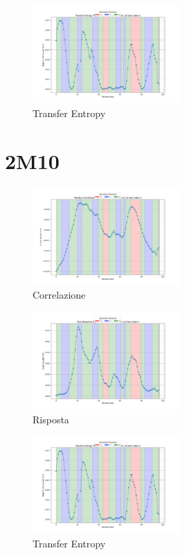 \documentclass{article}
\begin{document}
\begin{figure}[h]
    \centering
    \includegraphics[width=0.5\textwidth]{images/Transfer Entropy TE_ij for i=22 as a function of j at time index 0.png}
    \caption{Transfer Entropy}
\end{figure}




\section{2M10}
\begin{figure}[h]
    \centering
    \includegraphics[width=0.5\textwidth]{images/Residual Correlation C_ij for i=22 as a function of j at time index 0.png}
    \caption{Correlazione}
\end{figure}
\begin{figure}[h]
    \centering
    \includegraphics[width=0.5\textwidth]{images/Time Response R_ij for i=22 as a function of j at time index 0.png}
    \caption{Risposta}
\end{figure}

\begin{figure}[h]
    \centering
    \includegraphics[width=0.5\textwidth]{images/Transfer Entropy TE_ij for i=22 as a function of j at time index 0.png}
    \caption{Transfer Entropy}
\end{figure}
\end{document}
